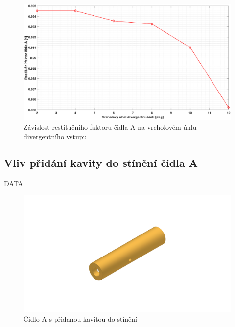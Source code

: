         \begin{figure}[ht!]
            \centering
            \includegraphics*[width=\textwidth, trim={5.25cm 1.0cm 5.8cm 2.0cm}]{400_SIMULACE_KONSTRUKCNICH_UPRAV/Grafy/08_divergentni_cast_A.eps}
            \caption{Závislost restitučního faktoru čidla A na vrcholovém úhlu divergentního vstupu}
            \label{fig:divergentni-cast-A}
        \end{figure}
    
    \newpage
    \subsection{Vliv přidání kavity do stínění čidla A}
        DATA
        
        \begin{figure}[ht!]
            \centering
            \includegraphics[width=\textwidth]{400_SIMULACE_KONSTRUKCNICH_UPRAV/Vykresy_rendery/Kavita.png}
            \caption{Čidlo A s přidanou kavitou do stínění}
            \label{fig:kavita-A}
        \end{figure}
    
